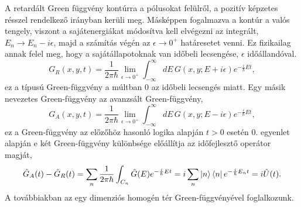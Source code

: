 A retardált Green függvény kontúrra a pólusokat felülről, a pozitív képzetes résszel rendelkező irányban kerüli meg. Másképpen fogalmazva a kontúr a valós tengely, viszont a sajátenergiákat módosítva kell elvégezni az integrált, $E_n\to E_n-i\epsilon$, majd a számítás végén az $\epsilon\to 0^+$ határesetet venni. Ez fizikailag annak felel meg, hogy a sajátállapotoknak van időbeli lecsengése, $\epsilon$ időállandóval.
\begin{equation}
	G_R(x,y,t)=\frac{1}{2\pi\hbar}\lim_{\epsilon\to 0^+}\int_{-\infty}^{\infty}dE\,G(x,y;E+i\epsilon)e^{-\frac{i}{\hbar}Et},
\end{equation}
ez a típusú Green-függvény a múltban $0$ az időbeli lecsengés miatt. Egy másik nevezetes Green-függvény az avanzsált Green-függvény,
\begin{equation}
	G_A(x,y,t)=\frac{1}{2\pi\hbar}\lim_{\epsilon\to 0^+}\int_{-\infty}^{\infty}dE\,G(x,y;E-i\epsilon)e^{-\frac{i}{\hbar}Et},
\end{equation}
ez a Green-függvény az előzőhöz hasonló logika alapján $t>0$ esetén $0$.  egyenlet alapján e két Green-függvény különbsége előállítja az időfejlesztő operátor magját,
\begin{equation}
	\hat{G}_A(t)-\hat{G}_R(t)=\sum_n\frac{1}{2\pi\hbar}\int_{C_n}\hat{G}(E)e^{-\frac{i}{\hbar}Et}=i\sum_n\Ket{n}\Bra{n}e^{-\frac{i}{\hbar}E_nt}=i\hat{U}(t).
\end{equation}
A továbbiakban az egy dimenziós homogén tér Green-függvényével foglalkozunk.







